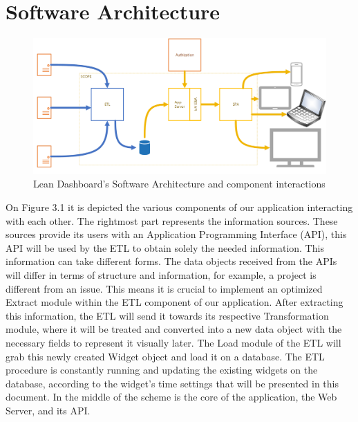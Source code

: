 \documentclass[a4paper,twoside,10pt]{report}
\begin{document}
\newpage
\section{Software Architecture}
\begin{figure}[h!]
\center
    \includegraphics[width=\textwidth]{lean-dashboard-software-architecture.png}
    \caption{Lean Dashboard's Software Architecture and component interactions}
\end{figure}
On Figure 3.1 it is depicted the various components of our application interacting with each other.
\newline
The rightmost part represents the information sources. These sources provide its users with an Application Programming Interface (API), this API will be used by the  ETL to obtain solely the needed information.
\newline
This information can take different forms. The data objects received from the APIs will differ in terms of structure and information, for example, a project is different from an issue. This means it is crucial to implement an optimized Extract module within the ETL component of our application.
\newline
After extracting this information, the ETL will send it towards its respective Transformation module, where it will be treated and converted into a new data object with the necessary fields to represent it visually later.
\newline
The Load module of the ETL will grab this newly created Widget object and load it on a database.
\newline
The ETL procedure is constantly running and updating the existing widgets on the database, according to the widget's time settings that will be presented in this document.
\newline
In the middle of the scheme is the core of the application, the Web Server, and its API.
\newline
\end{document}
